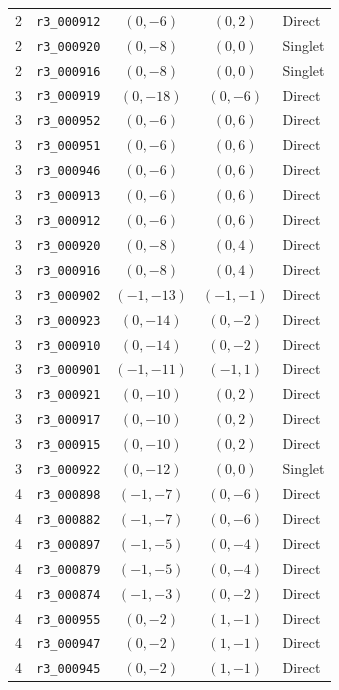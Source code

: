 \begin{longtable}{@{}rlccl@{}}
2 & \texttt{r3\_000912} & $(0,-6)$ & $(0,2)$ & Direct\\
2 & \texttt{r3\_000920} & $(0,-8)$ & $(0,0)$ & Singlet\\
2 & \texttt{r3\_000916} & $(0,-8)$ & $(0,0)$ & Singlet\\
3 & \texttt{r3\_000919} & $(0,-18)$ & $(0,-6)$ & Direct\\
3 & \texttt{r3\_000952} & $(0,-6)$ & $(0,6)$ & Direct\\
3 & \texttt{r3\_000951} & $(0,-6)$ & $(0,6)$ & Direct\\
3 & \texttt{r3\_000946} & $(0,-6)$ & $(0,6)$ & Direct\\
3 & \texttt{r3\_000913} & $(0,-6)$ & $(0,6)$ & Direct\\
3 & \texttt{r3\_000912} & $(0,-6)$ & $(0,6)$ & Direct\\
3 & \texttt{r3\_000920} & $(0,-8)$ & $(0,4)$ & Direct\\
3 & \texttt{r3\_000916} & $(0,-8)$ & $(0,4)$ & Direct\\
3 & \texttt{r3\_000902} & $(-1,-13)$ & $(-1,-1)$ & Direct\\
3 & \texttt{r3\_000923} & $(0,-14)$ & $(0,-2)$ & Direct\\
3 & \texttt{r3\_000910} & $(0,-14)$ & $(0,-2)$ & Direct\\
3 & \texttt{r3\_000901} & $(-1,-11)$ & $(-1,1)$ & Direct\\
3 & \texttt{r3\_000921} & $(0,-10)$ & $(0,2)$ & Direct\\
3 & \texttt{r3\_000917} & $(0,-10)$ & $(0,2)$ & Direct\\
3 & \texttt{r3\_000915} & $(0,-10)$ & $(0,2)$ & Direct\\
3 & \texttt{r3\_000922} & $(0,-12)$ & $(0,0)$ & Singlet\\
4 & \texttt{r3\_000898} & $(-1,-7)$ & $(0,-6)$ & Direct\\
4 & \texttt{r3\_000882} & $(-1,-7)$ & $(0,-6)$ & Direct\\
4 & \texttt{r3\_000897} & $(-1,-5)$ & $(0,-4)$ & Direct\\
4 & \texttt{r3\_000879} & $(-1,-5)$ & $(0,-4)$ & Direct\\
4 & \texttt{r3\_000874} & $(-1,-3)$ & $(0,-2)$ & Direct\\
4 & \texttt{r3\_000955} & $(0,-2)$ & $(1,-1)$ & Direct\\
4 & \texttt{r3\_000947} & $(0,-2)$ & $(1,-1)$ & Direct\\
4 & \texttt{r3\_000945} & $(0,-2)$ & $(1,-1)$ & Direct\\

\end{longtable}
